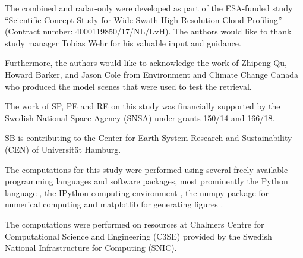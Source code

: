 \documentclass[journal abbreviation, manuscript]{copernicus}
\begin{document}

\begin{acknowledgements}

The combined and radar-only were developed as part of the ESA-funded study
``Scientific Concept Study for Wide-Swath High-Resolution Cloud Profiling''
(Contract number: 4000119850/17/NL/LvH). The authors would like to thank
study manager Tobias Wehr for his valuable input and guidance.

Furthermore, the authors would like to acknowledge the work of Zhipeng Qu,
Howard Barker, and Jason Cole from Environment and Climate Change Canada who
produced the model scenes that were used to test the retrieval.

The work of SP, PE and RE on this study was financially supported by the Swedish
National Space Agency (SNSA) under grants 150/14 and 166/18.

SB is contributing to the Center for Earth System Research and Sustainability
(CEN) of Universit\"{a}t Hamburg.

The computations for this study were performed using several freely available programming
languages and software packages, most prominently the Python language
\citep{python}, the IPython computing environment \citep{ipython}, the numpy
package for numerical computing \citep{numpy} and matplotlib for generating
figures \citep{matplotlib}.

The computations were performed on resources at Chalmers Centre for
Computational Science and Engineering (C3SE) provided by the Swedish National
Infrastructure for Computing (SNIC).

\end{acknowledgements}












\end{document}
